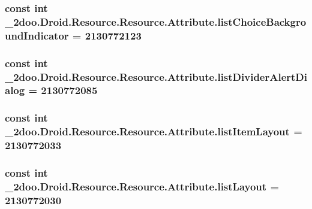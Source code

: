 \hypertarget{class__2doo_1_1_droid_1_1_resource_1_1_attribute_f3664dcb68eac88d72068589fd20fef1}{
\subsubsection[{listChoiceBackgroundIndicator}]{\setlength{\rightskip}{0pt plus 5cm}const int \_\-2doo.Droid.Resource.Resource.Attribute.listChoiceBackgroundIndicator = 2130772123}}
\label{class__2doo_1_1_droid_1_1_resource_1_1_attribute_f3664dcb68eac88d72068589fd20fef1}


\hypertarget{class__2doo_1_1_droid_1_1_resource_1_1_attribute_4e819892f780eb7a65650ca9c37d48fb}{
\subsubsection[{listDividerAlertDialog}]{\setlength{\rightskip}{0pt plus 5cm}const int \_\-2doo.Droid.Resource.Resource.Attribute.listDividerAlertDialog = 2130772085}}
\label{class__2doo_1_1_droid_1_1_resource_1_1_attribute_4e819892f780eb7a65650ca9c37d48fb}


\hypertarget{class__2doo_1_1_droid_1_1_resource_1_1_attribute_936bdbe83baa6080d8052a85dbd45006}{
\subsubsection[{listItemLayout}]{\setlength{\rightskip}{0pt plus 5cm}const int \_\-2doo.Droid.Resource.Resource.Attribute.listItemLayout = 2130772033}}
\label{class__2doo_1_1_droid_1_1_resource_1_1_attribute_936bdbe83baa6080d8052a85dbd45006}


\hypertarget{class__2doo_1_1_droid_1_1_resource_1_1_attribute_1f3820d4d7bd6e63705d5b2c38fe1db2}{
\subsubsection[{listLayout}]{\setlength{\rightskip}{0pt plus 5cm}const int \_\-2doo.Droid.Resource.Resource.Attribute.listLayout = 2130772030}}
\label{class__2doo_1_1_droid_1_1_resource_1_1_attribute_1f3820d4d7bd6e63705d5b2c38fe1db2}


